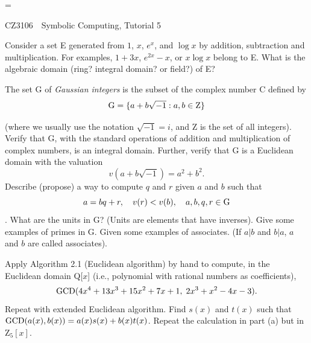\magnification=

\nopagenumbers


\centerline{\titlefont CZ3106\ \  Symbolic Computing, Tutorial 5}
\bigskip
\bigskip
{}
\bigskip
\bigskip

\problem Consider a set E generated from $1$, $x$, $e^x$, and $\log x$ by
addition, subtraction and multiplication. For examples, $1 + 3 x$,
$e^{2x} - x$, or $x \log x$ belong to E. 
What is the algebraic domain (ring? integral domain? or field?) of E? 

\problem The set G of {\sl Gaussian integers} is the subset of
the complex number C defined by
$$ {\rm G} = \{ a + b \sqrt{-1}: a, b \in {\rm Z}\}$$
\item{} (where we usually use the notation $\sqrt{-1} = i$, and Z
is the set of all integers).  
 Verify that G,
with the standard operations of addition and multiplication of complex
numbers, is an integral domain.  Further, verify that G is a Euclidean
domain with the valuation
$$ v(a+b\sqrt{-1}) = a^2 + b^2.$$
Describe (propose) a way to compute $q$ and $r$ given $a$ and $b$ such
that
$$a = bq + r, \quad v(r) < v(b), \quad a, b, q, r \in {\rm G}$$.
 What are the units in G?  (Units are elements that
have inverses). 
Give some examples of primes in G. Given some examples of associates.
(If $a|b$ and $b|a$, $a$ and $b$ are called associates).

\problem 
{} Apply Algorithm 2.1 (Euclidean algorithm) 
by hand to compute, in the Euclidean domain Q[$x$] (i.e., polynomial
with rational numbers as coefficients),
$$ {\rm GCD}(4x^4+13x^3+15x^2+7x+1,\; 2x^3+x^2-4x-3).$$
 Repeat with extended Euclidean algorithm. Find $s(x)$ and
$t(x)$ such that ${\rm GCD}(a(x),b(x)) = a(x)s(x) + b(x)t(x)$.
 Repeat the calculation in part (a) but in Z$_5[x]$.





\bye

